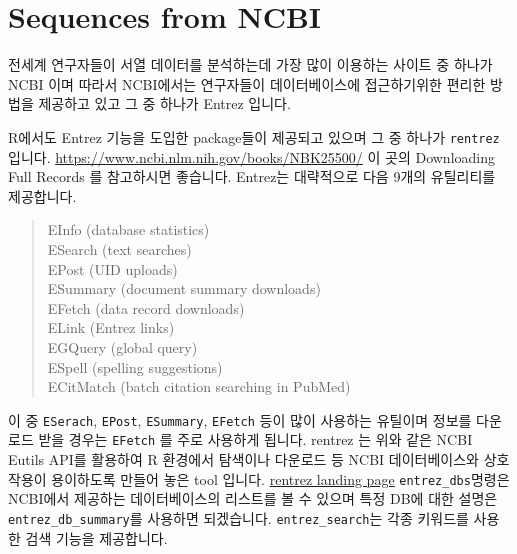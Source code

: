 \documentclass[
]{book}
\begin{document}
\hypertarget{sequences-from-ncbi}{%
\section{Sequences from NCBI}\label{sequences-from-ncbi}}

전세계 연구자들이 서열 데이터를 분석하는데 가장 많이 이용하는 사이트 중 하나가 NCBI 이며 따라서 NCBI에서는 연구자들이 데이터베이스에 접근하기위한 편리한 방법을 제공하고 있고 그 중 하나가 Entrez 입니다.

R에서도 Entrez 기능을 도입한 package들이 제공되고 있으며 그 중 하나가 \texttt{rentrez} 입니다. \url{https://www.ncbi.nlm.nih.gov/books/NBK25500/} 이 곳의 Downloading Full Records 를 참고하시면 좋습니다. Entrez는 대략적으로 다음 9개의 유틸리티를 제공합니다.

\begin{quote}
EInfo (database statistics)\\
ESearch (text searches)\\
EPost (UID uploads)\\
ESummary (document summary downloads)\\
EFetch (data record downloads)\\
ELink (Entrez links)\\
EGQuery (global query)\\
ESpell (spelling suggestions)\\
ECitMatch (batch citation searching in PubMed)
\end{quote}

이 중 \texttt{ESerach}, \texttt{EPost}, \texttt{ESummary}, \texttt{EFetch} 등이 많이 사용하는 유틸이며 정보를 다운로드 받을 경우는 \texttt{EFetch} 를 주로 사용하게 됩니다. rentrez 는 위와 같은 NCBI Eutils API를 활용하여 R 환경에서 탐색이나 다운로드 등 NCBI 데이터베이스와 상호작용이 용이하도록 만들어 놓은 tool 입니다. \href{https://cran.r-project.org/web/packages/rentrez/vignettes/rentrez_tutorial.html}{rentrez landing page} \texttt{entrez\_dbs}명령은 NCBI에서 제공하는 데이터베이스의 리스트를 볼 수 있으며 특정 DB에 대한 설명은 \texttt{entrez\_db\_summary}를 사용하면 되겠습니다. \texttt{entrez\_search}는 각종 키워드를 사용한 검색 기능을 제공합니다.
\end{document}
